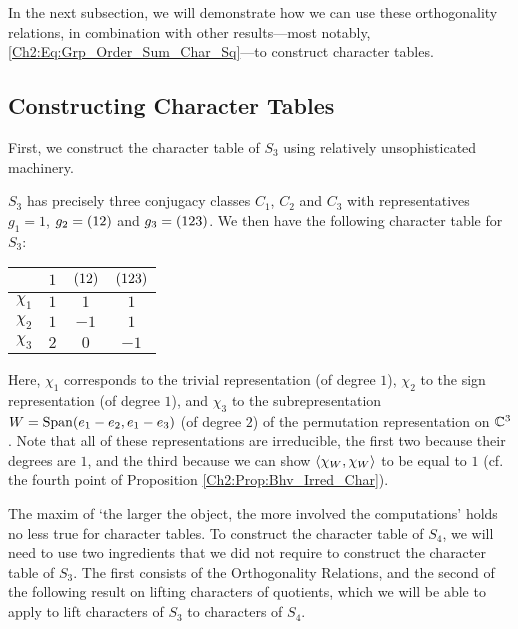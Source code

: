 In the next subsection, we will demonstrate how we can use these orthogonality relations, in combination with other results---most notably, \eqref{Ch2:Eq:Grp_Order_Sum_Char_Sq}---to construct character tables.

\subsection{Constructing Character Tables}

First, we construct the character table of $S_3$ using relatively unsophisticated machinery.

\begin{boxexample}[$S_3$]\label{Ch2:Eg:S3_CharTable}
    $S_3$ has precisely three conjugacy classes $C_1$, $C_2$ and $C_3$ with representatives $g_1 = 1$, $g_2 = \left( 1 2 \right)$ and $g_3 = \left( 1 2 3 \right)$. We then have the following character table for $S_3$:
    \begin{table}[H]
        \centering
        \begin{tabular}{c|ccc}
            & $1$ & $\left( 12 \right)$ & $\left( 123 \right)$ \\
            \hline
            $\chi_1$ & $1$ & $1$ & $1$ \\
            $\chi_2$ & $1$ & $-1$ & $1$ \\
            $\chi_3$ & $2$ & $0$ & $-1$
        \end{tabular}
    \end{table}
    Here, $\chi_1$ corresponds to the trivial representation (of degree $1$), $\chi_2$ to the sign representation (of degree $1$), and $\chi_3$ to the subrepresentation $W = \operatorname{Span}\!\left( e_1 - e_2, e_1 - e_3 \right)$ (of degree $2$) of the permutation representation on $\mathbb{C}^3$. Note that all of these representations are irreducible, the first two because their degrees are $1$, and the third because we can show $\left\langle \chi_W, \chi_W \right\rangle$ to be equal to $1$ (cf. the fourth point of Proposition \ref{Ch2:Prop:Bhv_Irred_Char}).
\end{boxexample}

The maxim of `the larger the object, the more involved the computations' holds no less true for character tables. To construct the character table of $S_4$, we will need to use two ingredients that we did not require to construct the character table of $S_3$. The first consists of the Orthogonality Relations, and the second of the following result on lifting characters of quotients, which we will be able to apply to lift characters of $S_3$ to characters of $S_4$.

